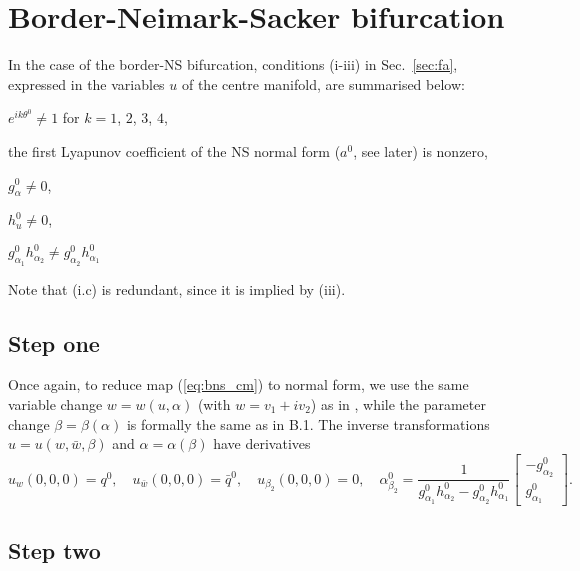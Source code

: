 \documentclass[final,onefignum]{siamltex}
\begin{document}
\section{Border-Neimark-Sacker bifurcation}
In the case of the border-NS bifurcation, conditions (i-iii) in Sec.~\ref{sec:fa}, expressed in the variables $u$ of the centre manifold, are summarised below:
\begin{list}{C}{}
 \item[(i.a)] $e^{ik\theta^0}\neq 1$ for $k=1$, $2$, $3$, $4$,
 \item[(i.b)] the first Lyapunov coefficient of the NS normal form ($a^0$, see later) is nonzero,
 \item[(i.c)] $g_{\alpha}^0\neq 0$,
 \item[(ii)] $h_u^0\neq 0$,
 \item[(iii)] $g^0_{\alpha_1}h_{\alpha_2}^0 \neq g^0_{\alpha_2}h_{\alpha_1}^0$
\end{list}
Note that (i.c) is redundant, since it is implied by (iii).

\subsection{Step one}
Once again, to reduce map (\ref{eq:bns_cm}) to normal form, we use the same variable change $w=w(u,\alpha)$ (with $w=v_1+iv_2$) as in \citep{Kuznetsov04}, while the parameter change $\beta=\beta(\alpha)$ is formally the same as in B.1.
The inverse transformations $u=u(w,\bar{w},\beta)$ and $\alpha=\alpha(\beta)$ have derivatives
$$
u_{w}(0,0,0)=q^0,\quad u_{\bar{w}}(0,0,0)=\bar{q}^0,\quad
u_{\beta_2}(0,0,0)=0,\quad
\alpha_{\beta_2}^0={\displaystyle \frac{\displaystyle {1}}{\displaystyle {g^0_{\alpha_1}h^0_{\alpha_2}-g^0_{\alpha_2}h^0_{\alpha_1}}}}
\left[\begin{array}{c}
-g^0_{\alpha_2}\\
g^0_{\alpha_1}
\end{array}\right].
$$

\subsection{Step two}
\end{document}
